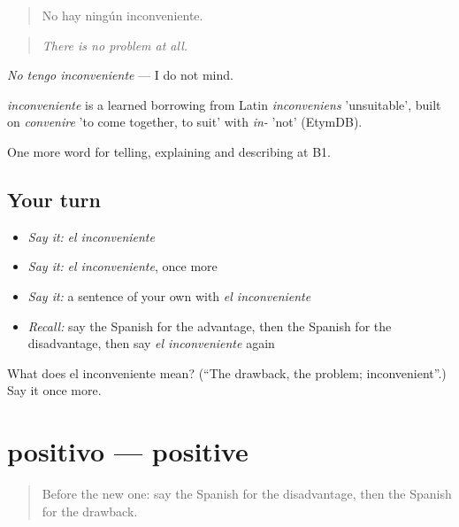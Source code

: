 \begin{quote}
No hay ningún inconveniente.
\end{quote}

\begin{quote}
\emph{There is no problem at all.}
\end{quote}

\emph{No tengo inconveniente} — I do not mind.

\begin{cousinweb}
\emph{inconveniente} is a learned borrowing from Latin \emph{inconveniens} 'unsuitable', built on \emph{convenire} 'to come together, to suit' with \emph{in-} 'not' (EtymDB).
\end{cousinweb}

\begin{grammarlens}[title={What you've built}]
One more word for telling, explaining and describing at B1.
\end{grammarlens}

\subsection*{Your turn}
\begin{itemize}
\raggedright
  \item \emph{Say it:} \emph{el inconveniente}
  \item \emph{Say it:} \emph{el inconveniente}, once more
  \item \emph{Say it:} a sentence of your own with \emph{el inconveniente}
  \item \emph{Recall:} say the Spanish for the advantage, then the Spanish for the disadvantage, then say \emph{el inconveniente} again
\end{itemize}

\begin{tcolorbox}[breakable,colback=teal!4,colframe=teal!35!black,title={Before you move on}]
What does el inconveniente mean? (\textquotedblleft{}The drawback, the problem; inconvenient\textquotedblright{}.) Say it once more.
\end{tcolorbox}
\section[positivo]{positivo — positive}

\label{lesson:ES-C584-positivo}



\begin{quote}
Before the new one: say the Spanish for the disadvantage, then the Spanish for the drawback.
\end{quote}

